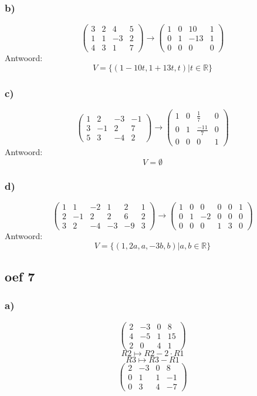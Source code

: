 \documentclass[lineaire_algebra_oplossingen.tex]{subfiles}
\begin{document}
\subsubsection*{b)}
\[
\begin{pmatrix}
3 &  2 &  4 &  5\\
1 &  1 & -3 &  2\\
4 &  3 &  1 &  7
\end{pmatrix}
\longrightarrow
\begin{pmatrix}
1 &  0 & 10 &  1\\
0 &  1 & -13&  1\\
0 &  0 &  0 &  0
\end{pmatrix}
\]
Antwoord:
\[
V=\{(1-10t,1+13t,t) | t \in \mathbb{R}\}
\]

\subsubsection*{c)}
\[
\begin{pmatrix}
1 &  2 & -3 & -1\\
3 & -1 &  2 &  7\\
5 &  3 & -4 &  2
\end{pmatrix}
\longrightarrow
\begin{pmatrix}
1 &  0 & \frac{1}{7} &  0\\
0 &  1 & \frac{-11}{7}&  0\\
0 &  0 &  0 &  1
\end{pmatrix}
\]
Antwoord:
\[
V=\emptyset
\]

\subsubsection*{d)}
\[
\begin{pmatrix}
1 &  1 & -2 &  1 &  2 & 1\\
2 & -1 &  2 &  2 &  6 & 2\\
3 &  2 & -4 & -3 & -9 & 3
\end{pmatrix}
\longrightarrow
\begin{pmatrix}
1 &  0 &  0 &  0 &  0 & 1\\
0 &  1 & -2 &  0 &  0 & 0\\
0 &  0 &  0 &  1 &  3 & 0
\end{pmatrix}
\]
Antwoord:
\[
V=\{(1,2a,a,-3b,b) | a,b \in \mathbb{R} \}
\]

\subsection{oef 7}
\subsubsection*{a)}
\[
\begin{pmatrix}
2 & -3 & 0 & 8\\
4 & -5 & 1 & 15\\
2 & 0 & 4 & 1
\end{pmatrix}
\]
\[ R2 \longmapsto R2 - 2\cdot R1\]
\[ R3 \longmapsto R3 -  R1\]
\[
\begin{pmatrix}
2 & -3 & 0 & 8\\
0 & 1 & 1 & -1\\
0 & 3 & 4 & -7
\end{pmatrix}
\]
\end{document}
